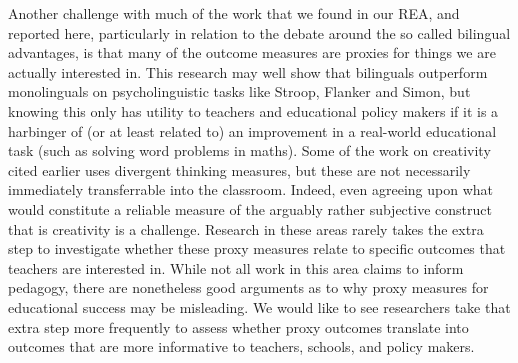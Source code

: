 \documentclass[output=paper]{langscibook}
\begin{document}
Another challenge with much of the work that we found in our REA, and reported here, particularly in relation to the debate around the so called bilingual advantages, is that many of the outcome measures are proxies for things we are actually interested in. This research may well show that bilinguals outperform monolinguals on psycholinguistic tasks like Stroop, Flanker and Simon, but knowing this only has utility to teachers and educational policy makers if it is a harbinger of (or at least related to) an improvement in a real-world educational task (such as solving word problems in maths). Some of the work on creativity cited earlier uses divergent thinking measures, but these are not necessarily immediately transferrable into the classroom. Indeed, even agreeing upon what would constitute a reliable measure of the arguably rather subjective construct that is creativity is a challenge. Research in these areas rarely takes the extra step to investigate whether these proxy measures relate to specific outcomes that teachers are interested in. While not all work in this area claims to inform pedagogy, there are nonetheless good arguments as to why proxy measures for educational success may be misleading. We would like to see researchers take that extra step more frequently to assess whether proxy outcomes translate into outcomes that are more informative to teachers, schools, and policy makers.
\end{document}
